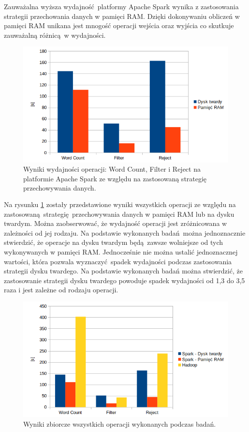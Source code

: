 Zauważalna wyższa wydajność platformy Apache Spark wynika z zastosowania strategii przechowania danych w pamięci RAM. Dzięki dokonywaniu obliczeń w pamięci RAM unikana jest mnogość operacji wejścia oraz wyjścia co skutkuje zauważalną różnicą w wydajności.
\begin{figure}[!htb]
	\centering
	\includegraphics[scale=0.6]{results-spark-strategy-comparison-bar.png}
	\caption{Wyniki wydajności operacji: Word Count, Filter i Reject na platformie Apache Spark ze względu na zastosowaną strategię przechowywania danych.}
	\label{fig:results-spark-strategy-comparison-bar}
\end{figure}
Na rysunku \ref{fig:results-spark-strategy-comparison-bar} zostały przedstawione wyniki wszystkich operacji ze względu na zastosowaną strategię przechowywania danych w pamięci RAM lub na dysku twardym. Można zaobserwować, że wydajność operacji jest zróżnicowana w zależności od jej rodzaju. Na podstawie wykonanych badań można jednoznacznie stwierdzić, że operacje na dysku twardym będą zawsze wolniejsze od tych wykonywanych w pamięci RAM. Jednocześnie nie można ustalić jednoznacznej wartości, która pozwala wyznaczyć spadek wydajności podczas zastosowania strategii dysku twardego. Na podstawie wykonanych badań można stwierdzić, że zastosowanie strategii dysku twardego powoduje spadek wydajności od 1,3 do 3,5 raza i jest zależne od rodzaju operacji. 
\begin{figure}[!htb]
	\centering
	\includegraphics[scale=0.6]{results-comparison-bar-all.png}
	\caption{Wyniki zbiorcze wszystkich operacji wykonanych podczas badań.}
	\label{fig:results-comparison-bar-all}
\end{figure}
